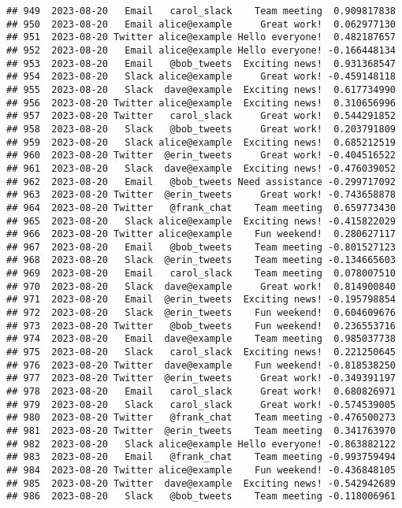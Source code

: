 \documentclass[
]{article}
\begin{document}
\begin{verbatim}
## 949  2023-08-20   Email   carol_slack    Team meeting  0.909817838
## 950  2023-08-20   Email alice@example     Great work!  0.062977130
## 951  2023-08-20 Twitter alice@example Hello everyone!  0.482187657
## 952  2023-08-20   Email alice@example Hello everyone! -0.166448134
## 953  2023-08-20   Email   @bob_tweets  Exciting news!  0.931368547
## 954  2023-08-20   Slack alice@example     Great work! -0.459148118
## 955  2023-08-20   Slack  dave@example  Exciting news!  0.617734990
## 956  2023-08-20 Twitter alice@example  Exciting news!  0.310656996
## 957  2023-08-20 Twitter   carol_slack     Great work!  0.544291852
## 958  2023-08-20   Slack   @bob_tweets     Great work!  0.203791809
## 959  2023-08-20   Slack alice@example  Exciting news!  0.685212519
## 960  2023-08-20 Twitter  @erin_tweets     Great work! -0.404516522
## 961  2023-08-20   Slack  dave@example  Exciting news! -0.476039052
## 962  2023-08-20   Email   @bob_tweets Need assistance -0.299717092
## 963  2023-08-20 Twitter  @erin_tweets     Great work! -0.743658878
## 964  2023-08-20 Twitter   @frank_chat    Team meeting  0.659773430
## 965  2023-08-20   Slack alice@example  Exciting news! -0.415822029
## 966  2023-08-20 Twitter alice@example    Fun weekend!  0.280627117
## 967  2023-08-20   Email   @bob_tweets    Team meeting -0.801527123
## 968  2023-08-20   Slack  @erin_tweets    Team meeting -0.134665603
## 969  2023-08-20   Email   carol_slack    Team meeting  0.078007510
## 970  2023-08-20   Slack  dave@example     Great work!  0.814900840
## 971  2023-08-20   Email  @erin_tweets  Exciting news! -0.195798854
## 972  2023-08-20   Slack  @erin_tweets    Fun weekend!  0.604609676
## 973  2023-08-20 Twitter   @bob_tweets    Fun weekend!  0.236553716
## 974  2023-08-20   Email  dave@example    Team meeting  0.985037738
## 975  2023-08-20   Slack   carol_slack  Exciting news!  0.221250645
## 976  2023-08-20 Twitter  dave@example    Fun weekend! -0.818538250
## 977  2023-08-20 Twitter  @erin_tweets     Great work! -0.349391197
## 978  2023-08-20   Email   carol_slack     Great work!  0.680826971
## 979  2023-08-20   Slack   carol_slack     Great work! -0.574539005
## 980  2023-08-20 Twitter   @frank_chat    Team meeting -0.476500273
## 981  2023-08-20 Twitter  @erin_tweets    Team meeting  0.341763970
## 982  2023-08-20   Slack alice@example Hello everyone! -0.863882122
## 983  2023-08-20   Email   @frank_chat    Team meeting -0.993759494
## 984  2023-08-20 Twitter alice@example    Fun weekend! -0.436848105
## 985  2023-08-20 Twitter  dave@example  Exciting news! -0.542942689
## 986  2023-08-20   Slack   @bob_tweets    Team meeting -0.118006961

\end{verbatim}
\end{document}
